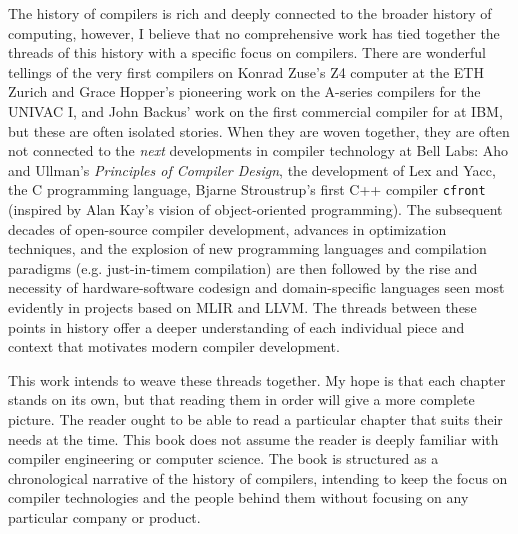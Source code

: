 
The history of compilers is rich and deeply connected to the broader history of computing,
however, I believe that no comprehensive work has tied together the threads of this history
with a specific focus on compilers.
There are wonderful tellings of the very first compilers on Konrad Zuse's Z4 computer at the ETH Zurich
and Grace Hopper's pioneering work on the A-series compilers for the UNIVAC I,
and John Backus' work on the first commercial compiler for \FTN{} at IBM,
but these are often isolated stories.
When they are woven together, they are often not connected to the
\textit{next} developments in compiler technology at Bell Labs:
Aho and Ullman's \textit{Principles of Compiler Design}, the development of Lex and Yacc,
the C programming language, Bjarne Stroustrup's first C++ compiler \texttt{cfront}
(inspired by Alan Kay's vision of object-oriented programming).
The subsequent decades of open-source compiler development, advances in optimization techniques,
and the explosion of new programming languages and compilation paradigms
(e.g. just-in-timem compilation) are then followed by the
rise and necessity of hardware-software codesign and domain-specific languages
seen most evidently in projects based on MLIR and LLVM.
The threads between these points in history offer a deeper understanding of
each individual piece and context that motivates modern compiler development.


This work intends to weave these threads together.
My hope is that each chapter stands on its own, but that reading them in order will give a more complete picture.
The reader ought to be able to read a particular chapter that suits their needs at the time.
This book does not assume the reader is deeply familiar with compiler engineering or computer science.
The book is structured as a chronological narrative of the history of compilers,
intending to keep the focus on compiler technologies and the people behind them
without focusing on any particular company or product.
